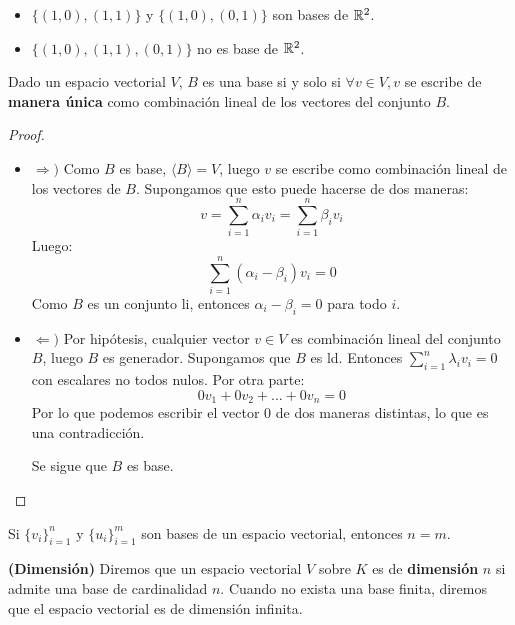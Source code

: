 \begin{ejemplo}
	\begin{itemize}
		\item $\{(1,0), (1,1)\}$ y $\{(1,0), (0,1)\}$ son bases de $\mathbb{R}^2$. 
		\item $\{(1,0), (1,1), (0,1)\}$ no es base de $\mathbb{R}^2$. 
	\end{itemize} 
\end{ejemplo}

\begin{proposicion}
	Dado un espacio vectorial $V$, $B$ es una base si y solo si $\forall v \in V, v$ se escribe de \textbf{manera única } como combinación lineal de los vectores del conjunto $B$. 
\end{proposicion}

\begin{proof}
	\begin{itemize}
		\item $\Rightarrow )$ Como $B$ es base, $\langle B \rangle = V$, luego $v$ se escribe como combinación lineal de los vectores de $B$.   Supongamos que esto puede hacerse de dos maneras: 
		$$ v = \sum_{i=1}^n \alpha_i v_i = \sum_{i=1}^n \beta_i v_i $$ 
		Luego:   
		$$ \sum_{i=1}^n (\alpha_i - \beta_i ) v_i = 0$$ 
		Como $B$ es un conjunto li, entonces $\alpha_i - \beta_i = 0$ para todo $i$.   
		\item $\Leftarrow)$ Por hipótesis, cualquier vector $v \in V$ es combinación lineal del conjunto $B$, luego $B$ es generador. Supongamos que $B$ es ld. Entonces $\sum_{i=1}^n \lambda_i v_i = 0$ con escalares no todos nulos. Por otra parte:
		$$ 0 v_1  + 0 v_2 + ... + 0v_n = 0$$   
		Por lo que podemos escribir el vector $0$ de dos maneras distintas, lo que es una contradicción. 
		
		Se sigue que $B$ es base. 
	\end{itemize}
\end{proof}

\begin{corolario}
	Si $\{ v_i \}_{i=1}^n$ y $\{ u_i \}_{i= 1}^m$ son bases de un espacio vectorial, entonces $n= m$.
\end{corolario}

\begin{definicion}
	\textbf{(Dimensión)}
	Diremos que un espacio vectorial $V$ sobre $K$ es de \textbf{dimensión} $n$ si admite una base de cardinalidad $n$. Cuando no exista una base finita, diremos que el espacio vectorial es de dimensión infinita. 
\end{definicion}

